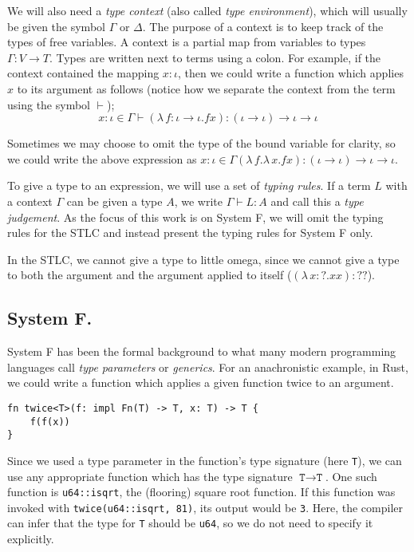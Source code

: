 We will also need a \textit{type context} (also called \textit{type environment}), which will
usually be given the symbol $\Gamma$ or $\Delta$. The purpose of a context is to keep track of the
types of free variables. A context is a partial map from variables to types $\Gamma \colon V \to T$.
Types are written next to terms using a colon. For example, if the context contained the mapping $x
\colon \iota$, then we could write a function which applies $x$ to its argument as follows (notice
how we separate the context from the term using the symbol $\vdash$);
\begin{equation*}
  x \colon \iota \in \Gamma \vdash (\lambda \, f \colon \iota \to \iota . f x)
  \colon (\iota \to \iota) \to \iota \to \iota
\end{equation*}

Sometimes we may choose to omit the type of the bound variable for clarity, so we could write the
above expression as $x \colon \iota \in \Gamma (\lambda \, f. \lambda \, x. fx) \colon (\iota \to
\iota) \to \iota \to \iota$.

To give a type to an expression, we will use a set of \textit{typing rules}. If a term $L$ with a
context $\Gamma$ can be given a type $A$, we write $\Gamma \vdash L \colon A$ and call this a
\textit{type judgement}. As the focus of this work is on System F, we will omit the typing rules for
the STLC and instead present the typing rules for System F only.

In the STLC, we cannot give a type to little omega, since we cannot give a type to both the argument
and the argument applied to itself ($(\lambda \, x  \colon ? . x x) \colon ??$).

\subsection{System F.}
System F has been the formal background to what many modern programming languages call \textit{type
parameters} or \textit{generics}. For an anachronistic example, in Rust, we could write a function
which applies a given function twice to an argument.

\begin{verbatim}
fn twice<T>(f: impl Fn(T) -> T, x: T) -> T {
    f(f(x))
}
\end{verbatim}

Since we used a type parameter in the function's type signature (here \texttt{T}), we can use any
appropriate function which has the type signature $\texttt{T} \to \texttt{T}$. One such function is
\texttt{u64::isqrt}, the (flooring) square root function. If this function was invoked with
\texttt{twice(u64::isqrt, 81)}, its output would be \texttt{3}. Here, the compiler can infer that
the type for \texttt{T} should be \texttt{u64}, so we do not need to specify it explicitly.

